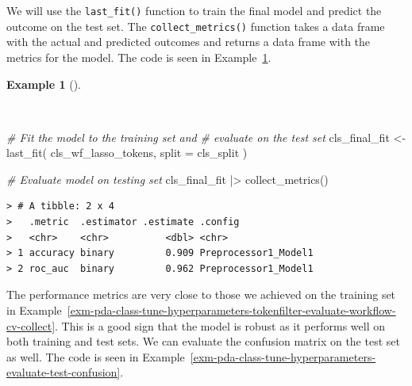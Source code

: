 \documentclass[
  letterpaper,
]{latex/krantz}
\newenvironment{Shaded}{\begin{snugshade}}{\end{snugshade}}
\newcommand{\AttributeTok}[1]{\textcolor[rgb]{0.00,0.00,0.00}{#1}}
\newcommand{\CommentTok}[1]{\textcolor[rgb]{0.00,0.00,0.00}{\textit{#1}}}
\newcommand{\FunctionTok}[1]{\textcolor[rgb]{0.00,0.00,0.00}{#1}}
\newcommand{\NormalTok}[1]{\textcolor[rgb]{0.00,0.00,0.00}{#1}}
\newcommand{\OtherTok}[1]{\textcolor[rgb]{0.00,0.00,0.00}{#1}}
\newcommand{\SpecialCharTok}[1]{\textcolor[rgb]{0.00,0.00,0.00}{#1}}
\theoremstyle{definition}
\newtheorem{example}{Example}[chapter]
\theoremstyle{remark}
\begin{document}
We will use the \texttt{last\_fit()} function to train the final model
and predict the outcome on the test set. The \texttt{collect\_metrics()}
function takes a data frame with the actual and predicted outcomes and
returns a data frame with the metrics for the model. The code is seen in
Example~\ref{exm-pda-class-tune-hyperparameters-evaluate-test}.

\begin{example}[]\protect\hypertarget{exm-pda-class-tune-hyperparameters-evaluate-test}{}\label{exm-pda-class-tune-hyperparameters-evaluate-test}

~

\begin{Shaded}
\begin{Highlighting}[]
\CommentTok{\# Fit the model to the training set and}
\CommentTok{\# evaluate on the test set}
\NormalTok{cls\_final\_fit }\OtherTok{\textless{}{-}}
  \FunctionTok{last\_fit}\NormalTok{(}
\NormalTok{    cls\_wf\_lasso\_tokens,}
    \AttributeTok{split =}\NormalTok{ cls\_split}
\NormalTok{  )}

\CommentTok{\# Evaluate model on testing set}
\NormalTok{cls\_final\_fit }\SpecialCharTok{|\textgreater{}}
  \FunctionTok{collect\_metrics}\NormalTok{()}
\end{Highlighting}
\end{Shaded}

\begin{verbatim}
> # A tibble: 2 x 4
>   .metric  .estimator .estimate .config             
>   <chr>    <chr>          <dbl> <chr>               
> 1 accuracy binary         0.909 Preprocessor1_Model1
> 2 roc_auc  binary         0.962 Preprocessor1_Model1
\end{verbatim}

\end{example}

The performance metrics are very close to those we achieved on the
training set in
Example~\ref{exm-pda-class-tune-hyperparameters-tokenfilter-evaluate-workflow-cv-collect}.
This is a good sign that the model is robust as it performs well on both
training and test sets. We can evaluate the confusion matrix on the test
set as well. The code is seen in
Example~\ref{exm-pda-class-tune-hyperparameters-evaluate-test-confusion}.
\end{document}
